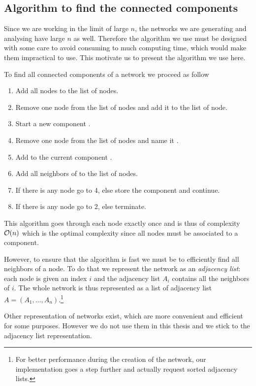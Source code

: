 \documentclass[
11pt, %
english, %
singlespacing, %
nolistspacing, %
liststotoc, %
headsepline, %
]{MastersDoctoralThesis} %
\begin{document}
\subsection{Algorithm to find the connected components}

Since we are working in the limit of large $n$, the networks we are generating and analysing have large $n$ as well. Therefore the algorithm we use must be designed with some care to avoid consuming to much computing time, which would make them impractical to use. This motivate us to present the algorithm we use here.

To find all connected components of a network we proceed as follow
\begin{enumerate}
	\item Add all nodes to the list of  nodes.
	\item Remove one node from the list of  nodes and add it to the list of  node.
	\item Start a new component .
	\item Remove one node from the list of  nodes and name it .
	\item Add  to the current component .
	\item Add all  neighbors of  to the list of  nodes.
	\item If there is any  node go to 4, else store the component  and continue.
	\item If there is any  node go to 2, else terminate.
\end{enumerate}
This algorithm goes through each node exactly once and is thus of complexity $\mathcal{O}\!\left(n\right)$ which is the optimal complexity since all nodes must be associated to a component.

However, to ensure that the algorithm is fast we must be to efficiently find all neighbors of a node. To do that we represent the network as an \emph{adjacency list}: each node is given an index $i$ and the adjacency list $A_i$ contains all the neighbors of $i$. The whole network is thus represented as a list of adjacency list $A = (A_1, \dots, A_n)$.\footnote{For better performance during the creation of the network, our implementation goes a step further and actually request sorted adjacency lists.}

Other representation of networks exist, which are more convenient and efficient for some purposes. However we do not use them in this thesis and we stick to the adjacency list representation.
\end{document}
